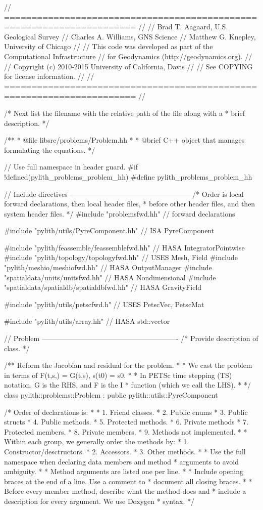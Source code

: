 \begin{cplusplus}
// ======================================================================
//
// Brad T. Aagaard, U.S. Geological Survey
// Charles A. Williams, GNS Science
// Matthew G. Knepley, University of Chicago
//
// This code was developed as part of the Computational Infrastructure
// for Geodynamics (http://geodynamics.org).
//
// Copyright (c) 2010-2015 University of California, Davis
//
// See COPYING for license information.
//
// ======================================================================
//

/* Next list the filename with the relative path of the file along with a
 * brief description.
 */  

/**
 * @file libsrc/problems/Problem.hh
 *
 * @brief C++ object that manages formulating the equations.
 */

// Use full namespace in header guard.
#if !defined(pylith_problems_problem_hh)
#define pylith_problems_problem_hh

// Include directives ---------------------------------------------------
/* Order is local forward declarations, then local header files,
 * before other header files, and then system header files.
 */
#include "problemsfwd.hh" // forward declarations

#include "pylith/utils/PyreComponent.hh" // ISA PyreComponent

#include "pylith/feassemble/feassemblefwd.hh" // HASA IntegratorPointwise
#include "pylith/topology/topologyfwd.hh" // USES Mesh, Field
#include "pylith/meshio/meshiofwd.hh" // HASA OutputManager
#include "spatialdata/units/unitsfwd.hh" // HASA Nondimensional
#include "spatialdata/spatialdb/spatialdbfwd.hh" // HASA GravityField

#include "pylith/utils/petscfwd.h" // USES PetscVec, PetscMat

#include "pylith/utils/array.hh" // HASA std::vector


// Problem ----------------------------------------------------------
/* Provide description of class.
 */
 
/** Reform the Jacobian and residual for the problem.
 *
 * We cast the problem in terms of F(t,s,) = G(t,s), s(t0) = s0.
 *
 * In PETSc time stepping (TS) notation, G is the RHS, and F is the I
 * function (which we call the LHS).
 *
 */
class pylith::problems::Problem : public pylith::utils::PyreComponent {
  /* Order of declarations is:
  *
  * 1. Friend classes.
  * 2. Public enums
  * 3. Public structs
  * 4. Public methods.
  * 5. Protected methods.
  * 6. Private methods
  * 7. Protected members.
  * 8. Private members.
  * 9. Methods not implemented.
  *
  * Within each group, we generally order the methods by:
  * 1. Constructor/desctructors.
  * 2. Accessors.
  * 3. Other methods.
  *
  * Use the full namespace when declaring data members and method
  * arguments to avoid ambiguity.
  *
  * Method arguments are listed one per line.
  *
  * Include opening braces at the end of a line. Use a comment to
  * document all closing braces.
  *
  * Before every member method, describe what the method does and
  * include a description for every argument. We use Doxygen
  * syntax.
  */

}
\end{cplusplus}
